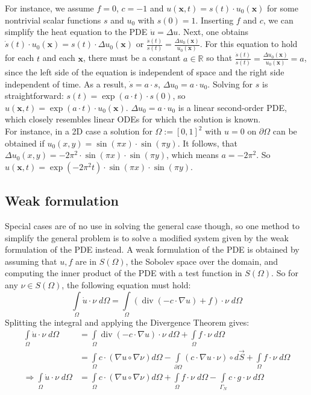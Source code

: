 \documentclass{IOS-Book-Article}
\theoremstyle{plain}
\theoremstyle{definition}
\DeclareMathOperator{\diverg}{div}
\begin{document}
For instance, we assume $f = 0$, $c = -1$ and $u(\mathbf x, t) = s(t) \cdot u_0(\mathbf x)$ for some nontrivial scalar functions $s$ and $u_0$ with $s(0) = 1$. Inserting $f$ and $c$, we can simplify the heat equation to the PDE $\dot u = \Delta u$.
Next, one obtains $\dot s(t) \cdot u_0(\mathbf x) = s(t) \cdot \Delta u_0(\mathbf x)$ or $\frac{\dot s(t)}{s(t)} = \frac{\Delta u_0(\mathbf x)}{u_0(\mathbf x)}$. For this equation to hold for each $t$ and each $\mathbf x$, there must be a constant $a \in \mathbb{R}$ so that $\frac{\dot s(t)}{s(t)} = \frac{\Delta u_0(\mathbf x)}{u_0(\mathbf x)} = a$, since the left side of the equation is independent of space and the right side independent of time. As a result, $\dot s = a \cdot s$, $\Delta u_0 = a \cdot u_0$. Solving for $s$ is straightforward:
$s(t) = \exp(a \cdot t) \cdot s(0)$, so $u(\mathbf x, t) = \exp(a \cdot t) \cdot u_0(\mathbf x)$. $\Delta u_0 = a \cdot u_0$ is a linear second-order PDE, which closely resembles linear ODEs for which the solution is known.\\
For instance, in a 2D case a solution for $\Omega := [0, 1]^2$ with $u = 0$ on $\partial \Omega$ can be obtained if $u_0(x, y) = \sin(\pi x) \cdot \sin(\pi y)$. It follows, that $\Delta u_0(x, y) = -2 \pi^2 \cdot \sin(\pi x) \cdot \sin(\pi y)$, which means $a = -2 \pi^2$. So $u(\mathbf x, t) = \exp(-2 \pi^2 t) \cdot \sin(\pi x) \cdot \sin(\pi y)$.

\subsection{Weak formulation}

Special cases are of no use in solving the general case though, so one method to simplify the general problem is to solve a modified system given by the weak formulation of the PDE instead. A weak formulation of the PDE is obtained by assuming that $u, f$ are in $S(\Omega)$, the Sobolev space over the domain, and computing the inner product of the PDE with a test function in $S(\Omega)$. So for any $\nu \in S(\Omega)$, the following equation must hold:
\begin{equation}
	\int \limits_{\Omega} \dot u \cdot \nu \; d\Omega = \int \limits_{\Omega} \left( \diverg (- c \cdot \nabla u) + f \right) \cdot \nu \; d\Omega
\end{equation}
Splitting the integral and applying the Divergence Theorem gives:
\begin{align}
	\int \limits_{\Omega} \dot u \cdot \nu \; d\Omega &= \int \limits_{\Omega} \diverg (- c \cdot \nabla u) \cdot \nu \; d\Omega + \int \limits_{\Omega} f \cdot \nu \; d\Omega \\
	&= \int \limits_{\Omega} c \cdot (\nabla u \circ \nabla \nu ) d\Omega - \int \limits_{\partial \Omega} (c \cdot \nabla u \cdot \nu) \circ d \vec{S} + \int \limits_{\Omega} f \cdot \nu \; d\Omega \\
	\Rightarrow \int \limits_{\Omega} \dot u \cdot \nu \; d\Omega &= \int \limits_{\Omega} c \cdot ( \nabla u \circ \nabla \nu ) d\Omega + \int \limits_{\Omega} f \cdot \nu \; d\Omega - \int \limits_{\Gamma_N} c \cdot g \cdot \nu \; d\Omega
	\label{eqn:heq_weak_form}
\end{align}
\end{document}
